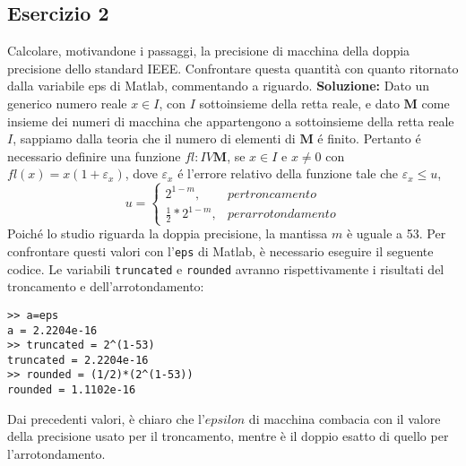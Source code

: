 \subsection{Esercizio 2}
Calcolare, motivandone i passaggi, la precisione di macchina della doppia precisione
dello standard IEEE. Confrontare questa quantità con quanto ritornato dalla variabile eps di
Matlab, commentando a riguardo.
\newline \textbf{Soluzione:} \newline
Dato un generico numero reale $x \in I$, con $I$ sottoinsieme della retta reale, e
dato $\mathbf{M}$ come insieme dei numeri di macchina che appartengono a sottoinsieme
della retta reale $I$, sappiamo dalla teoria che il numero di elementi di $\mathbf{M}$ é finito.
Pertanto é necessario definire una funzione $fl: I V \mathbf{M}$, se $x \in I$ e $x \neq 0$ con
$fl(x) = x(1 + \varepsilon_x)$, dove $\varepsilon_x$ é l'errore relativo della funzione tale che $\varepsilon_x \leq u$,
\begin{equation*}
    u =\begin{cases}
        2^{1-m},             & per troncamento    \\
        \frac{1}{2}*2^{1-m}, & per arrotondamento
    \end{cases}
\end{equation*}
Poiché lo studio riguarda la doppia precisione, la mantissa $m$ è uguale a 53.
Per confrontare questi valori con l'\lstinline{eps} di Matlab, è necessario eseguire il seguente codice.
Le variabili \lstinline{truncated} e \lstinline{rounded} avranno rispettivamente i risultati del troncamento e dell'arrotondamento:
\begin{lstlisting}
>> a=eps
a = 2.2204e-16
>> truncated = 2^(1-53)
truncated = 2.2204e-16
>> rounded = (1/2)*(2^(1-53))
rounded = 1.1102e-16
\end{lstlisting}
Dai precedenti valori, è chiaro che l'$epsilon$ di macchina combacia con il valore
della precisione usato per il troncamento, mentre è il doppio esatto di quello per
l'arrotondamento.
